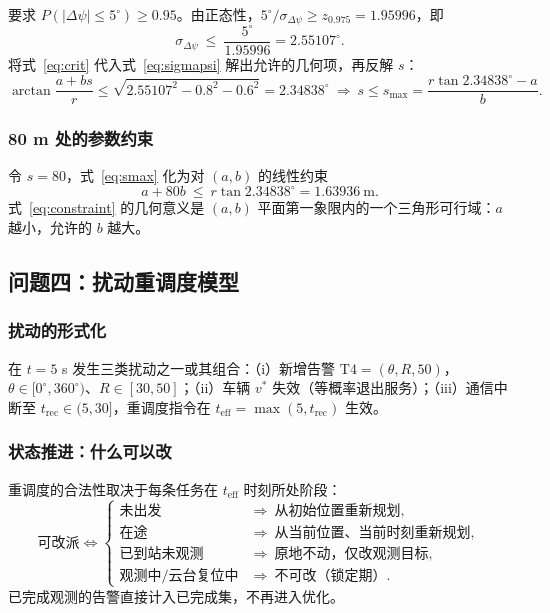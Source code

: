 \documentclass[UTF8,a4paper,zihao=-4,oneside]{ctexart}
\begin{document}
要求 $P(|\Delta\psi|\le5^\circ)\ge0.95$。由正态性，$5^\circ/\sigma_{\Delta\psi}\ge z_{0.975}=1.95996$，即
\begin{equation}
\label{eq:crit}
\sigma_{\Delta\psi}\ \le\ \frac{5^\circ}{1.95996}=2.55107^\circ .
\end{equation}
将式~\eqref{eq:crit} 代入式~\eqref{eq:sigmapsi} 解出允许的几何项，再反解 $s$：
\begin{equation}
\label{eq:smax}
\arctan\frac{a+bs}{r}\le\sqrt{2.55107^2-0.8^2-0.6^2}=2.34838^\circ
\ \Longrightarrow\
s\le s_{\max}=\frac{r\tan2.34838^\circ-a}{b}.
\end{equation}

\subsubsection{80 m 处的参数约束}

令 $s=80$，式~\eqref{eq:smax} 化为对 $(a,b)$ 的线性约束
\begin{equation}
\label{eq:constraint}
a+80b\ \le\ r\tan2.34838^\circ=1.63936\ \mathrm{m}.
\end{equation}
式~\eqref{eq:constraint} 的几何意义是 $(a,b)$ 平面第一象限内的一个三角形可行域：$a$ 越小，允许的 $b$ 越大。

\subsection{问题四：扰动重调度模型}

\subsubsection{扰动的形式化}

在 $t=5$ s 发生三类扰动之一或其组合：（i）新增告警 $\mathrm{T4}=(\theta,R,50)$，$\theta\in[0^\circ,360^\circ)$、$R\in[30,50]$；（ii）车辆 $v^\ast$ 失效（等概率退出服务）；（iii）通信中断至 $t_{\mathrm{rec}}\in(5,30]$，重调度指令在 $t_{\mathrm{eff}}=\max(5,t_{\mathrm{rec}})$ 生效。

\subsubsection{状态推进：什么可以改}

重调度的合法性取决于每条任务在 $t_{\mathrm{eff}}$ 时刻所处阶段：
\begin{equation}
\label{eq:state}
\text{可改派} \iff
\begin{cases}
\text{未出发} & \Rightarrow\ \text{从初始位置重新规划},\\
\text{在途} & \Rightarrow\ \text{从当前位置、当前时刻重新规划},\\
\text{已到站未观测} & \Rightarrow\ \text{原地不动，仅改观测目标},\\
\text{观测中/云台复位中} & \Rightarrow\ \text{不可改（锁定期）}.
\end{cases}
\end{equation}
已完成观测的告警直接计入已完成集，不再进入优化。
\end{document}
